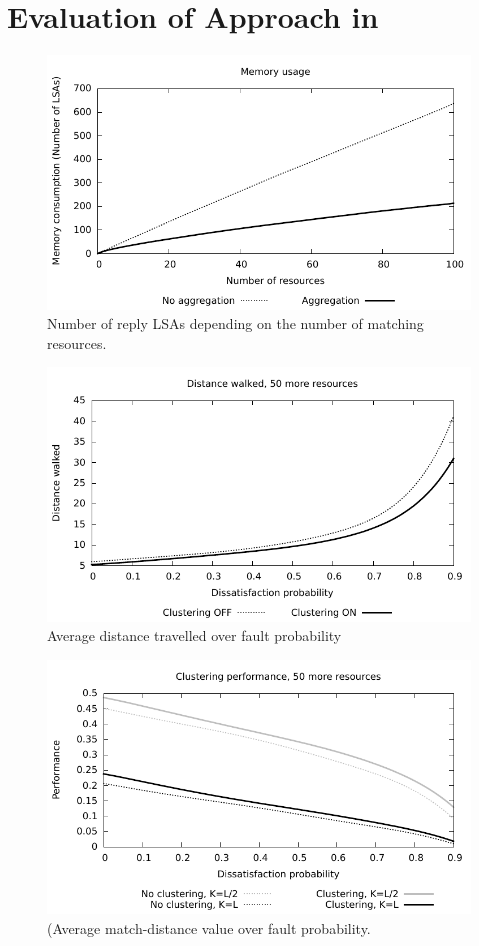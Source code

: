 \documentclass[12pt,a4paper,twoside,openright]{book}
\begin{document}
\section{Evaluation of Approach in \alchemist{}}
\begin{figure}
\centering
\includegraphics[width=\columnwidth]{img/memory}
\caption{Number of reply LSAs depending on the number of matching resources.} 
\label{fig:srd-sim1}
\end{figure}
\begin{figure}
\centering
\includegraphics[width=\columnwidth]{img/distance}
\caption{Average distance travelled over fault probability} 
\label{fig:srd-sim2}
\end{figure}

\begin{figure}
\centering
\includegraphics[width=\columnwidth]{img/cluster50}
\caption{(Average match-distance value over fault probability.} 
\label{fig:srd-sim3}
\end{figure}
\end{document}
